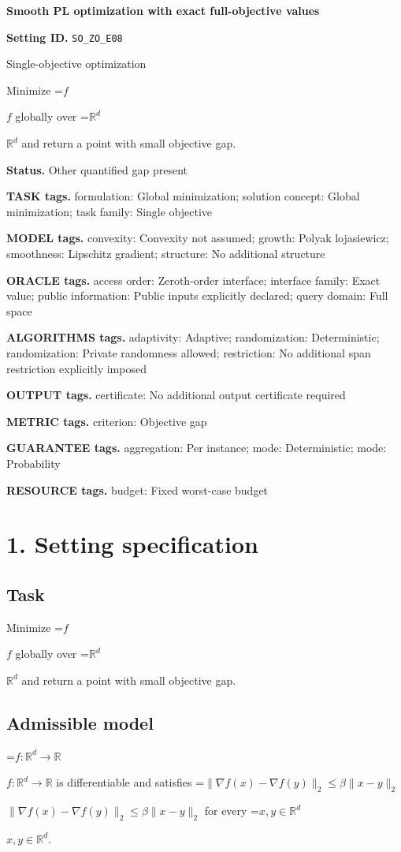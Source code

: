 \documentclass[10pt,a4paper]{article}
\newcommand{\AtlasMath}[1]{\par\begingroup\centering\setbox0=\hbox{$\displaystyle #1$}\ifdim\wd0>1.4\linewidth\typeout{ATLAS WIDE FORMULA: \the\wd0}\fi\ifdim\wd0>\linewidth\resizebox{\linewidth}{!}{\box0}\else\box0\fi\par\endgroup}
\newcommand{\AtlasInlineMath}[1]{\begingroup\setbox0=\hbox{$#1$}\ifdim\wd0>.4\linewidth\endgroup\AtlasMath{#1}\else\endgroup$#1$\fi}
\begin{document}
\raggedright

{\LARGE\bfseries\sffamily\color{AtlasNavy} Smooth PL optimization with exact full-objective values\par}\vspace{5pt}
\textbf{Setting ID.} \texttt{SO\_\allowbreak{}ZO\_\allowbreak{}E08}

Single-objective optimization

Minimize \AtlasInlineMath{f} globally over \AtlasInlineMath{\mathbb{R}^d} and return a point with small objective gap.

\textbf{Status.} Other quantified gap present

\textbf{TASK tags.} formulation: Global minimization; solution concept: Global minimization; task family: Single objective

\textbf{MODEL tags.} convexity: Convexity not assumed; growth: Polyak lojasiewicz; smoothness: Lipschitz gradient; structure: No additional structure

\textbf{ORACLE tags.} access order: Zeroth-order interface; interface family: Exact value; public information: Public inputs explicitly declared; query domain: Full space

\textbf{ALGORITHMS tags.} adaptivity: Adaptive; randomization: Deterministic; randomization: Private randomness allowed; restriction: No additional span restriction explicitly imposed

\textbf{OUTPUT tags.} certificate: No additional output certificate required

\textbf{METRIC tags.} criterion: Objective gap

\textbf{GUARANTEE tags.} aggregation: Per instance; mode: Deterministic; mode: Probability

\textbf{RESOURCE tags.} budget: Fixed worst-case budget

\section{1. Setting specification}
\subsection{Task}
Minimize \AtlasInlineMath{f} globally over \AtlasInlineMath{\mathbb{R}^d} and return a point with small objective gap.

\subsection{Admissible model}
\AtlasInlineMath{f:\mathbb{R}^d\to\mathbb{R}} is differentiable and satisfies \AtlasInlineMath{\|\nabla f(x)-\nabla f(y)\|_2\le\beta\|x-y\|_2} for every \AtlasInlineMath{x,y\in\mathbb{R}^d}.
\end{document}
